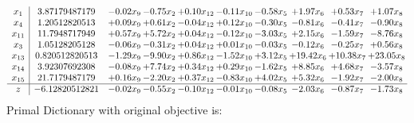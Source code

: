 \documentclass[9pt]{article}
\begin{document}
\[\begin{array}{c| c c@{\hskip 2pt} c@{\hskip 2pt} c@{\hskip 2pt} c@{\hskip 2pt} c@{\hskip 2pt} c@{\hskip 2pt} c@{\hskip 2pt} c@{\hskip 2pt} }
 x_{1}   &  3.87179487179 & -0.02 x_{9} & -0.75 x_{2} & +  0.10 x_{12} & -0.11 x_{10} & -0.58 x_{5} & +  1.97 x_{6} & +  0.53 x_{7} & +  1.07 x_{8}\\
 x_{4}   &  1.20512820513 & +  0.09 x_{9} & +  0.61 x_{2} & -0.04 x_{12} & +  0.12 x_{10} & -0.30 x_{5} & -0.81 x_{6} & -0.41 x_{7} & -0.90 x_{8}\\
 x_{11}   &  11.7948717949 & +  0.57 x_{9} & +  5.72 x_{2} & +  0.04 x_{12} & -0.12 x_{10} & -3.03 x_{5} & +  2.15 x_{6} & -1.59 x_{7} & -8.76 x_{8}\\
 x_{3}   &  1.05128205128 & -0.06 x_{9} & -0.31 x_{2} & +  0.04 x_{12} & +  0.01 x_{10} & -0.03 x_{5} & -0.12 x_{6} & -0.25 x_{7} & +  0.56 x_{8}\\
 x_{13}   &  0.820512820513 & -1.29 x_{9} & -9.90 x_{2} & +  0.86 x_{12} & -1.52 x_{10} & +  3.12 x_{5} & + 19.42 x_{6} & + 10.38 x_{7} & + 23.05 x_{8}\\
 x_{14}   &  3.92307692308 & -0.08 x_{9} & +  7.74 x_{2} & +  0.34 x_{12} & +  0.29 x_{10} & -1.62 x_{5} & +  8.85 x_{6} & +  4.68 x_{7} & -3.57 x_{8}\\
 x_{15}   &  21.7179487179 & +  0.16 x_{9} & -2.20 x_{2} & +  0.37 x_{12} & -0.83 x_{10} & +  4.02 x_{5} & +  5.32 x_{6} & -1.92 x_{7} & -2.00 x_{8}\\
\hline
z    &  -6.12820512821 & -0.02 x_{9} & -0.55 x_{2} & -0.10 x_{12} & -0.01 x_{10} & -0.08 x_{5} & -2.03 x_{6} & -0.87 x_{7} & -1.73 x_{8}\\
\end{array}\]
Primal Dictionary with original objective is:
\end{document}
